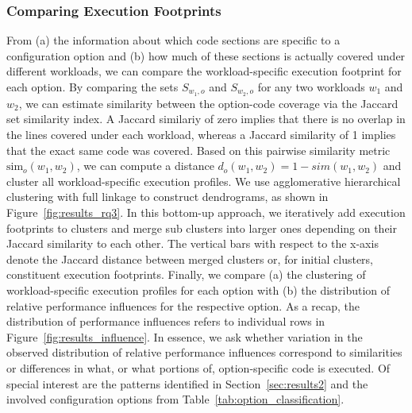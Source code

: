 \subsubsection{Comparing Execution Footprints}
From (a) the information about which code sections are specific to a configuration option and (b) how much of these sections is actually covered under different workloads, we can compare the workload-specific execution footprint for each option. By comparing the sets $S_{w_1, o}$ and $S_{w_2, o}$ for any two workloads $w_1$ and $w_2$, we can estimate similarity between the option-code coverage via the Jaccard set similarity index. A Jaccard similariy of zero implies that there is no overlap in the lines covered under each workload, whereas a Jaccard similarity of 1 implies that the exact same code was covered. Based on this pairwise similarity metric $\text{sim}_o(w_1, w_2)$, we can compute a distance $d_o(w_1, w_2) = 1 - sim(w_1, w_2)$ and cluster all workload-specific execution profiles. We use agglomerative hierarchical clustering with full linkage to construct dendrograms, as shown in Figure~\ref{fig:results_rq3}. In this bottom-up approach, we iteratively add execution footprints to clusters and merge sub clusters into larger ones depending on their Jaccard similarity  to each other. The vertical bars with respect to the x-axis denote the Jaccard distance between merged clusters or, for initial clusters, constituent execution footprints. Finally, we compare (a) the clustering of workload-specific execution profiles for each option with (b) the distribution of relative performance influences for the respective option. As a recap, the distribution of performance influences refers to individual rows in Figure~\ref{fig:results_influence}. In essence, we ask whether variation in the observed distribution of relative performance influences correspond to similarities or differences in what, or what portions of, option-specific code is executed. Of special interest are the patterns identified in Section~\ref{sec:results2} and the involved configuration options from Table~\ref{tab:option_classification}.

